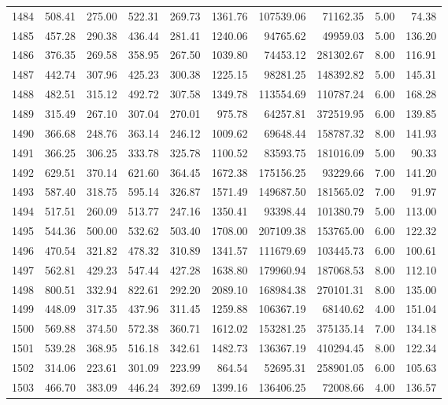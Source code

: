 \begin{tabular}{lrrrrrrrrr}
1484 & 508.41 & 275.00 & 522.31 & 269.73 & 1361.76 & 107539.06 & 71162.35 & 5.00 & 74.38 \\
1485 & 457.28 & 290.38 & 436.44 & 281.41 & 1240.06 & 94765.62 & 49959.03 & 5.00 & 136.20 \\
1486 & 376.35 & 269.58 & 358.95 & 267.50 & 1039.80 & 74453.12 & 281302.67 & 8.00 & 116.91 \\
1487 & 442.74 & 307.96 & 425.23 & 300.38 & 1225.15 & 98281.25 & 148392.82 & 5.00 & 145.31 \\
1488 & 482.51 & 315.12 & 492.72 & 307.58 & 1349.78 & 113554.69 & 110787.24 & 6.00 & 168.28 \\
1489 & 315.49 & 267.10 & 307.04 & 270.01 & 975.78 & 64257.81 & 372519.95 & 6.00 & 139.85 \\
1490 & 366.68 & 248.76 & 363.14 & 246.12 & 1009.62 & 69648.44 & 158787.32 & 8.00 & 141.93 \\
1491 & 366.25 & 306.25 & 333.78 & 325.78 & 1100.52 & 83593.75 & 181016.09 & 5.00 & 90.33 \\
1492 & 629.51 & 370.14 & 621.60 & 364.45 & 1672.38 & 175156.25 & 93229.66 & 7.00 & 141.20 \\
1493 & 587.40 & 318.75 & 595.14 & 326.87 & 1571.49 & 149687.50 & 181565.02 & 7.00 & 91.97 \\
1494 & 517.51 & 260.09 & 513.77 & 247.16 & 1350.41 & 93398.44 & 101380.79 & 5.00 & 113.00 \\
1495 & 544.36 & 500.00 & 532.62 & 503.40 & 1708.00 & 207109.38 & 153765.00 & 6.00 & 122.32 \\
1496 & 470.54 & 321.82 & 478.32 & 310.89 & 1341.57 & 111679.69 & 103445.73 & 6.00 & 100.61 \\
1497 & 562.81 & 429.23 & 547.44 & 427.28 & 1638.80 & 179960.94 & 187068.53 & 8.00 & 112.10 \\
1498 & 800.51 & 332.94 & 822.61 & 292.20 & 2089.10 & 168984.38 & 270101.31 & 8.00 & 135.00 \\
1499 & 448.09 & 317.35 & 437.96 & 311.45 & 1259.88 & 106367.19 & 68140.62 & 4.00 & 151.04 \\
1500 & 569.88 & 374.50 & 572.38 & 360.71 & 1612.02 & 153281.25 & 375135.14 & 7.00 & 134.18 \\
1501 & 539.28 & 368.95 & 516.18 & 342.61 & 1482.73 & 136367.19 & 410294.45 & 8.00 & 122.34 \\
1502 & 314.06 & 223.61 & 301.09 & 223.99 & 864.54 & 52695.31 & 258901.05 & 6.00 & 105.63 \\
1503 & 466.70 & 383.09 & 446.24 & 392.69 & 1399.16 & 136406.25 & 72008.66 & 4.00 & 136.57 \\

\end{tabular}
